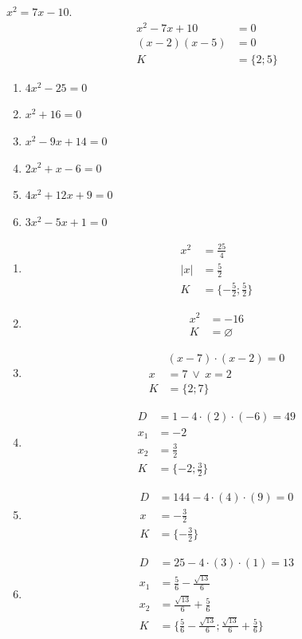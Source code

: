 \documentclass[11pt,a4paper]{article}
\begin{document}
\begin{zadaniReseniBox}[title={Rozšíření 3}]
$x^2=7x-10$.
\tcblower
\[\begin{aligned}
x^2-7x+10&=0\\(x-2)(x-5)&=0\\K&=\{2;5\}
\end{aligned}\]
\end{zadaniReseniBox}
\begin{zadaniReseniBox}[title={Domácí úkol}]
\begin{enumerate}[label=\alph*),itemsep=2pt]
\item $4x^{2} - 25=0$
\item $x^{2} + 16=0$
\item $x^{2} - 9x + 14=0$
\item $2x^{2} + x - 6=0$
\item $4x^{2} + 12x + 9=0$
\item $3x^{2} - 5x + 1=0$
\end{enumerate}
\tcblower
\begin{enumerate}[label=\alph*),itemsep=2pt]
\item
\[\begin{aligned}
x^2&=\frac{25}{4}\\|x|&=\frac52\\[2pt]
K&=\{- \frac{5}{2};\frac{5}{2}\}
\end{aligned}\]
\item
\[\begin{aligned}
x^2&=-16\\[2pt]
K&=\varnothing
\end{aligned}\]
\item
\[\begin{aligned}
&\left(x - 7\right) \cdot \left(x - 2\right)=0\\[2pt]
x&=7\ \vee\ x=2\\[2pt]
K&=\{2;7\}
\end{aligned}\]
\item
\[\begin{aligned}
D&=1-4\cdot(2)\cdot(-6)=49\\[2pt]
x_1&=-2\\[2pt]
x_2&=\frac{3}{2}\\[2pt]
K&=\{-2;\frac{3}{2}\}
\end{aligned}\]
\item
\[\begin{aligned}
D&=144-4\cdot(4)\cdot(9)=0\\[2pt]
x&=- \frac{3}{2}\\[2pt]
K&=\{- \frac{3}{2}\}
\end{aligned}\]
\item
\[\begin{aligned}
D&=25-4\cdot(3)\cdot(1)=13\\[2pt]
x_1&=\frac{5}{6} - \frac{\sqrt{13}}{6}\\[2pt]
x_2&=\frac{\sqrt{13}}{6} + \frac{5}{6}\\[2pt]
K&=\{\frac{5}{6} - \frac{\sqrt{13}}{6};\frac{\sqrt{13}}{6} + \frac{5}{6}\}
\end{aligned}\]
\end{enumerate}
\end{zadaniReseniBox}
\end{document}
